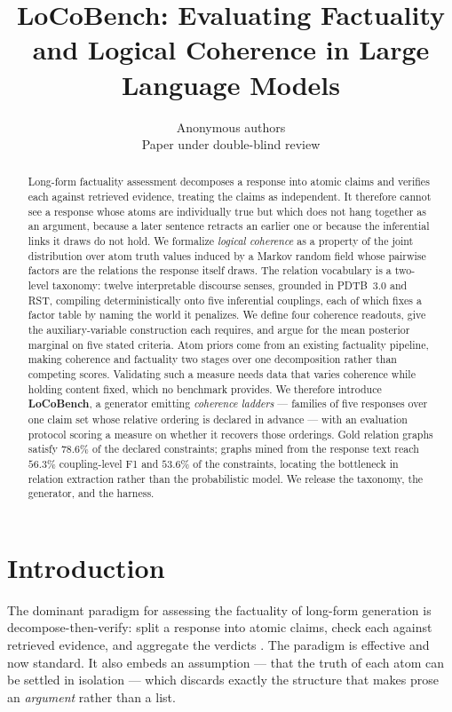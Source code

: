 \documentclass{article} %
\title{LoCoBench: Evaluating Factuality and Logical Coherence in Large Language Models}
\author{Anonymous authors\\Paper under double-blind review}
\begin{document}
\maketitle

\begin{abstract}
Long-form factuality assessment decomposes a response into atomic claims and verifies each
against retrieved evidence, treating the claims as independent. It therefore cannot see a
response whose atoms are individually true but which does not hang together as an argument,
because a later sentence retracts an earlier one or because the inferential links it draws do
not hold. We formalize \emph{logical coherence} as a property of the joint distribution over
atom truth values induced by a Markov random field whose pairwise factors are the relations
the response itself draws. The relation vocabulary is a two-level taxonomy: twelve
interpretable discourse senses, grounded in PDTB~3.0 and RST, compiling deterministically onto
five inferential couplings, each of which fixes a factor table by naming the world it
penalizes. We define four coherence readouts, give the auxiliary-variable construction each
requires, and argue for the mean posterior marginal on five stated criteria. Atom priors come
from an existing factuality pipeline, making coherence and factuality two stages over one
decomposition rather than competing scores. Validating such a measure needs data that varies
coherence while holding content fixed, which no benchmark provides. We therefore introduce
\textbf{LoCoBench}, a generator emitting \emph{coherence ladders} --- families of five
responses over one claim set whose relative ordering is declared in advance --- with an
evaluation protocol scoring a measure on whether it recovers those orderings. Gold relation
graphs satisfy $78.6\%$ of the declared constraints; graphs mined from the response text reach
$56.3\%$ coupling-level F1 and $53.6\%$ of the constraints, locating the bottleneck in
relation extraction rather than the probabilistic model. We release the taxonomy, the
generator, and the harness.
\end{abstract}

\section{Introduction}
\label{sec-intro}

The dominant paradigm for assessing the factuality of long-form generation is
decompose-then-verify: split a response into atomic claims, check each against retrieved
evidence, and aggregate the verdicts \citep{factscore,safe,veriscore}. The paradigm is
effective and now standard. It also embeds an assumption --- that the truth of each atom
can be settled in isolation --- which discards exactly the structure that makes prose an
\emph{argument} rather than a list.
\end{document}
